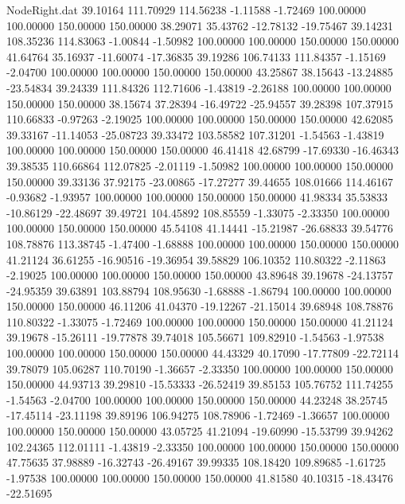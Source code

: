 \begin{filecontents}{NodeRight.dat}
  39.10164  111.70929  114.56238    -1.11588   -1.72469  100.00000  100.00000  150.00000  150.00000   38.29071   35.43762  -12.78132  -19.75467
  39.14231  108.35236  114.83063    -1.00844   -1.50982  100.00000  100.00000  150.00000  150.00000   41.64764   35.16937  -11.60074  -17.36835
  39.19286  106.74133  111.84357    -1.15169   -2.04700  100.00000  100.00000  150.00000  150.00000   43.25867   38.15643  -13.24885  -23.54834
  39.24339  111.84326  112.71606    -1.43819   -2.26188  100.00000  100.00000  150.00000  150.00000   38.15674   37.28394  -16.49722  -25.94557
  39.28398  107.37915  110.66833    -0.97263   -2.19025  100.00000  100.00000  150.00000  150.00000   42.62085   39.33167  -11.14053  -25.08723
  39.33472  103.58582  107.31201    -1.54563   -1.43819  100.00000  100.00000  150.00000  150.00000   46.41418   42.68799  -17.69330  -16.46343
  39.38535  110.66864  112.07825    -2.01119   -1.50982  100.00000  100.00000  150.00000  150.00000   39.33136   37.92175  -23.00865  -17.27277
  39.44655  108.01666  114.46167    -0.93682   -1.93957  100.00000  100.00000  150.00000  150.00000   41.98334   35.53833  -10.86129  -22.48697
  39.49721  104.45892  108.85559    -1.33075   -2.33350  100.00000  100.00000  150.00000  150.00000   45.54108   41.14441  -15.21987  -26.68833
  39.54776  108.78876  113.38745    -1.47400   -1.68888  100.00000  100.00000  150.00000  150.00000   41.21124   36.61255  -16.90516  -19.36954
  39.58829  106.10352  110.80322    -2.11863   -2.19025  100.00000  100.00000  150.00000  150.00000   43.89648   39.19678  -24.13757  -24.95359
  39.63891  103.88794  108.95630    -1.68888   -1.86794  100.00000  100.00000  150.00000  150.00000   46.11206   41.04370  -19.12267  -21.15014
  39.68948  108.78876  110.80322    -1.33075   -1.72469  100.00000  100.00000  150.00000  150.00000   41.21124   39.19678  -15.26111  -19.77878
  39.74018  105.56671  109.82910    -1.54563   -1.97538  100.00000  100.00000  150.00000  150.00000   44.43329   40.17090  -17.77809  -22.72114
  39.78079  105.06287  110.70190    -1.36657   -2.33350  100.00000  100.00000  150.00000  150.00000   44.93713   39.29810  -15.53333  -26.52419
  39.85153  105.76752  111.74255    -1.54563   -2.04700  100.00000  100.00000  150.00000  150.00000   44.23248   38.25745  -17.45114  -23.11198
  39.89196  106.94275  108.78906    -1.72469   -1.36657  100.00000  100.00000  150.00000  150.00000   43.05725   41.21094  -19.60990  -15.53799
  39.94262  102.24365  112.01111    -1.43819   -2.33350  100.00000  100.00000  150.00000  150.00000   47.75635   37.98889  -16.32743  -26.49167
  39.99335  108.18420  109.89685    -1.61725   -1.97538  100.00000  100.00000  150.00000  150.00000   41.81580   40.10315  -18.43476  -22.51695

\end{filecontents}
